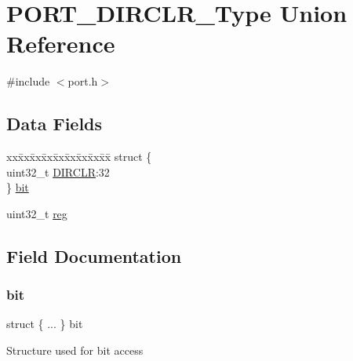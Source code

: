 \hypertarget{union_p_o_r_t___d_i_r_c_l_r___type}{}\section{P\+O\+R\+T\+\_\+\+D\+I\+R\+C\+L\+R\+\_\+\+Type Union Reference}
\label{union_p_o_r_t___d_i_r_c_l_r___type}


{\ttfamily \#include $<$port.\+h$>$}

\subsection*{Data Fields}
\begin{DoxyCompactItemize}
\item 
\begin{tabbing}
xx\=xx\=xx\=xx\=xx\=xx\=xx\=xx\=xx\=\kill
struct \{\\
\>uint32\_t \mbox{\hyperlink{union_p_o_r_t___d_i_r_c_l_r___type_a01d6566ffa5d96e262ec067b1dd152ba}{DIRCLR}}:32\\
\} \mbox{\hyperlink{union_p_o_r_t___d_i_r_c_l_r___type_adc10ffa3145b6cdae568b65359c44580}{bit}}\\

\end{tabbing}\item 
uint32\+\_\+t \mbox{\hyperlink{union_p_o_r_t___d_i_r_c_l_r___type_a6b91636401516a477989a336376d7b40}{reg}}
\end{DoxyCompactItemize}


\subsection{Field Documentation}
\mbox{\label{union_p_o_r_t___d_i_r_c_l_r___type_adc10ffa3145b6cdae568b65359c44580}} 
\subsubsection{\texorpdfstring{bit}{bit}}
{\footnotesize\ttfamily struct \{ ... \}   bit}

Structure used for bit access \mbox{\label{union_p_o_r_t___d_i_r_c_l_r___type_a01d6566ffa5d96e262ec067b1dd152ba}} 

